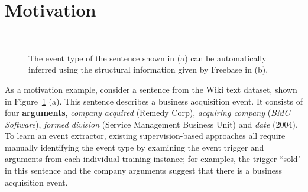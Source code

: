 \section{Motivation}
\begin{figure}
  \centering
   \\
  \caption{The event type of the sentence shown in (a) can be automatically inferred using the structural information given by Freebase in (b).}
  \label{fig:example}
\end{figure}


As a motivation example, consider a sentence from the Wiki text dataset, shown in Figure~\ref{fig:example} (a). This sentence describes a
business acquisition event. It consists of four \textbf{arguments}, \emph{company acquired} (Remedy Corp), \emph{acquiring company}
(\emph{BMC Software}), \emph{formed division} (Service Management Business Unit) and \emph{date} (2004). To learn an event extractor,
existing supervision-based approaches all require manually identifying the event type by examining the event trigger and arguments from
each individual training instance; for examples, the trigger ``sold" in this sentence  and the company arguments suggest that there is a
business acquisition event.

